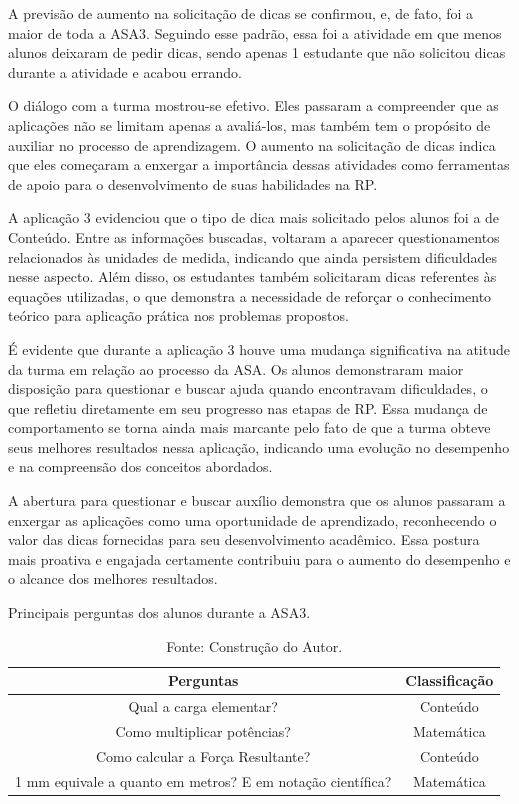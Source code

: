 A previsão de aumento na solicitação de dicas se confirmou, e, de fato, foi a maior de toda a ASA3. Seguindo esse padrão, essa foi a atividade em que menos alunos deixaram de pedir dicas, sendo apenas 1 estudante que não solicitou dicas durante a atividade e acabou errando.

O diálogo com a turma mostrou-se efetivo. Eles passaram a compreender que as aplicações não se limitam apenas a avaliá-los, mas também tem o propósito de auxiliar no processo de aprendizagem. O aumento na solicitação de dicas indica que eles começaram a enxergar a importância dessas atividades como ferramentas de apoio para o desenvolvimento de suas habilidades na RP.

A aplicação 3 evidenciou que o tipo de dica mais solicitado pelos alunos foi a de Conteúdo. Entre as informações buscadas, voltaram a aparecer questionamentos relacionados às unidades de medida, indicando que ainda persistem dificuldades nesse aspecto. Além disso, os estudantes também solicitaram dicas referentes às equações utilizadas, o que demonstra a necessidade de reforçar o conhecimento teórico para aplicação prática nos problemas propostos.

É evidente que durante a aplicação 3 houve uma mudança significativa na atitude da turma em relação ao processo da ASA. Os alunos demonstraram maior disposição para questionar e buscar ajuda quando encontravam dificuldades, o que refletiu diretamente em seu progresso nas etapas de RP. Essa mudança de comportamento se torna ainda mais marcante pelo fato de que a turma obteve seus melhores resultados nessa aplicação, indicando uma evolução no desempenho e na compreensão dos conceitos abordados.

A abertura para questionar e buscar auxílio demonstra que os alunos passaram a enxergar as aplicações como uma oportunidade de aprendizado, reconhecendo o valor das dicas fornecidas para seu desenvolvimento acadêmico. Essa postura mais proativa e engajada certamente contribuiu para o aumento do desempenho e o alcance dos melhores resultados.

\begin{table}[ht]
\centering
\caption{Principais perguntas dos alunos durante a ASA3.} \label{tab:pergASA3}
\begin{tabular}{c|c}
\hline
\textbf{Perguntas} & \textbf{Classificação}\\ \hline
Qual a carga elementar? & Conteúdo \\
Como multiplicar potências? & Matemática \\
Como calcular a Força Resultante? & Conteúdo \\
1 mm equivale a quanto em metros? E em notação científica? & Matemática \\
\hline
\end{tabular}
\caption*{Fonte: Construção do Autor.}
\end{table}


